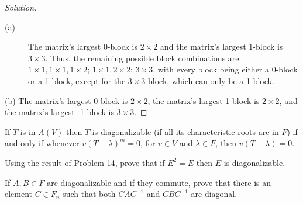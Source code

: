 \documentclass[12pt,leqno]{article}
\numberwithin{equation}{section}
\newcommand{\question}[2] {\vspace{.25in} \noindent\fbox{#1} #2 \vspace{.10in}}
\theoremstyle{definition}
\begin{document}
\begin{proof}[Solution]\indent
 \begin{description}
  \item [(a)] The matrix's largest 0-block is $2\times2$ and the matrix's largest 1-block is $3\times3$. Thus, the remaining possible block combinations are $1\times1,1\times1,1\times2$; $1\times1,2\times2$; $3\times3$, with every block being either a 0-block or a 1-block, except for the $3\times3$ block, which can only be a 1-block.
 \end{description}
  \item [(b)] The matrix's largest 0-block is $2\times2$, the matrix's largest 1-block is $2\times2$, and the matrix's largest -1-block is $3\times3$.
\end{proof}

\question{14}{If $T$ is in $A(V)$ then $T$ is diagonalizable (if all its characteristic roots are in $F$) if and only if whenever $v(T-\lambda)^m=0$, for $v\in V$ and $\lambda\in F$, then $v(T-\lambda)=0$.}

\question{15}{Using the result of Problem 14, prove that if $E^2=E$ then $E$ is diagonalizable.}

\question{19}{If $A,B\in F$ are diagonalizable and if they commute, prove that there is an element $C\in F_n$ such that both $CAC^{-1}$ and $CBC^{-1}$ are diagonal.}
\end{document}

